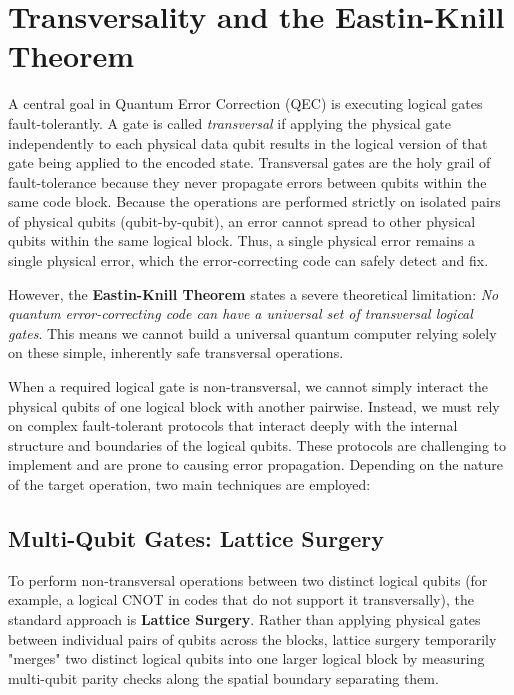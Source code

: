 \section{Transversality and the Eastin-Knill Theorem}

A central goal in Quantum Error Correction (QEC) is executing logical gates fault-tolerantly. A gate is called \textit{transversal} if applying the physical gate independently to each physical data qubit results in the logical version of that gate being applied to the encoded state. Transversal gates are the holy grail of fault-tolerance because they never propagate errors between qubits within the same code block. Because the operations are performed strictly on isolated pairs of physical qubits (qubit-by-qubit), an error cannot spread to other physical qubits within the same logical block. Thus, a single physical error remains a single physical error, which the error-correcting code can safely detect and fix.

However, the \textbf{Eastin-Knill Theorem} \cite{eastin2009restrictions} states a severe theoretical limitation: \textit{No quantum error-correcting code can have a universal set of transversal logical gates}. This means we cannot build a universal quantum computer relying solely on these simple, inherently safe transversal operations. 

When a required logical gate is non-transversal, we cannot simply interact the physical qubits of one logical block with another pairwise. Instead, we must rely on complex fault-tolerant protocols that interact deeply with the internal structure and boundaries of the logical qubits. These protocols are challenging to implement and are prone to causing error propagation. Depending on the nature of the target operation, two main techniques are employed:

\subsection*{Multi-Qubit Gates: Lattice Surgery}
 To perform non-transversal operations between two distinct logical qubits (for example, a logical CNOT in codes that do not support it transversally), the standard approach is \textbf{Lattice Surgery}. Rather than applying physical gates between individual pairs of qubits across the blocks, lattice surgery temporarily "merges" two distinct logical qubits into one larger logical block by measuring multi-qubit parity checks along the spatial boundary separating them. 

